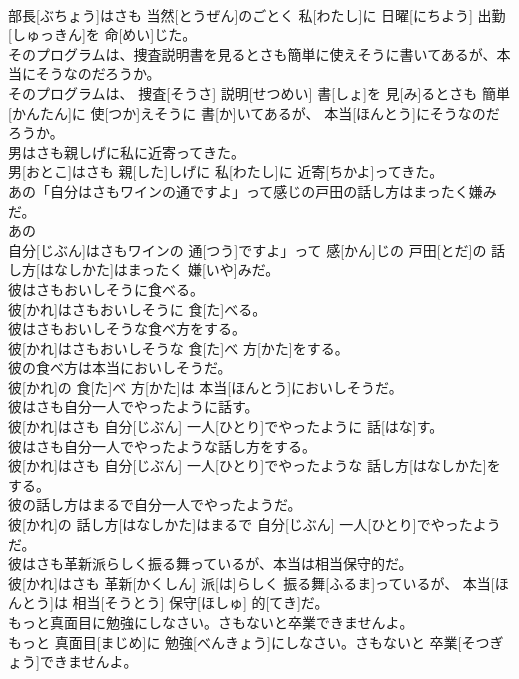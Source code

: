 \documentclass[8pt]{extreport}
\begin{document}
\begin{CJK}{UTF8}{min}
\\	部長[ぶちょう]はさも 当然[とうぜん]のごとく 私[わたし]に 日曜[にちよう] 出勤[しゅっきん]を 命[めい]じた。
\\	そのプログラムは、捜査説明書を見るとさも簡単に使えそうに書いてあるが、本当にそうなのだろうか。	
\\	そのプログラムは、 捜査[そうさ] 説明[せつめい] 書[しょ]を 見[み]るとさも 簡単[かんたん]に 使[つか]えそうに 書[か]いてあるが、 本当[ほんとう]にそうなのだろうか。
\\	男はさも親しげに私に近寄ってきた。	
\\	男[おとこ]はさも 親[した]しげに 私[わたし]に 近寄[ちかよ]ってきた。
\\	あの「自分はさもワインの通ですよ」って感じの戸田の話し方はまったく嫌みだ。	
\\	あの
\\	自分[じぶん]はさもワインの 通[つう]ですよ」って 感[かん]じの 戸田[とだ]の 話し方[はなしかた]はまったく 嫌[いや]みだ。
\\	彼はさもおいしそうに食べる。	
\\	彼[かれ]はさもおいしそうに 食[た]べる。
\\	彼はさもおいしそうな食べ方をする。	
\\	彼[かれ]はさもおいしそうな 食[た]べ 方[かた]をする。
\\	彼の食べ方は本当においしそうだ。	
\\	彼[かれ]の 食[た]べ 方[かた]は 本当[ほんとう]においしそうだ。
\\	彼はさも自分一人でやったように話す。	
\\	彼[かれ]はさも 自分[じぶん] 一人[ひとり]でやったように 話[はな]す。
\\	彼はさも自分一人でやったような話し方をする。	
\\	彼[かれ]はさも 自分[じぶん] 一人[ひとり]でやったような 話し方[はなしかた]をする。
\\	彼の話し方はまるで自分一人でやったようだ。	
\\	彼[かれ]の 話し方[はなしかた]はまるで 自分[じぶん] 一人[ひとり]でやったようだ。
\\	彼はさも革新派らしく振る舞っているが、本当は相当保守的だ。	
\\	彼[かれ]はさも 革新[かくしん] 派[は]らしく 振る舞[ふるま]っているが、 本当[ほんとう]は 相当[そうとう] 保守[ほしゅ] 的[てき]だ。
\\	もっと真面目に勉強にしなさい。さもないと卒業できませんよ。	
\\	もっと 真面目[まじめ]に 勉強[べんきょう]にしなさい。さもないと 卒業[そつぎょう]できませんよ。

\end{CJK}
\end{document}
